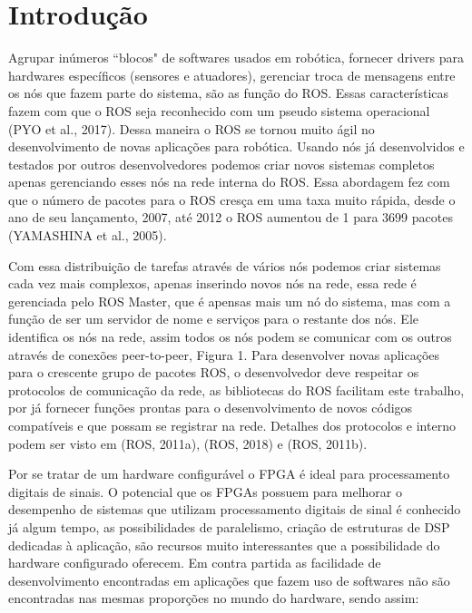 \chapter{Introdução}



Agrupar inúmeros “blocos" de softwares usados em robótica, fornecer drivers para hardwares
específicos (sensores e atuadores), gerenciar troca de mensagens entre os nós que fazem 
parte do sistema, são as função do ROS. Essas características fazem com que o ROS seja 
reconhecido com um pseudo sistema operacional (PYO et al., 2017). Dessa maneira o ROS se 
tornou muito ágil no desenvolvimento de novas aplicações para robótica. Usando nós já 
desenvolvidos e testados por outros desenvolvedores podemos criar novos sistemas 
completos apenas gerenciando esses nós na rede interna do ROS. Essa abordagem fez com 
que o número de pacotes para o ROS cresça em uma taxa muito rápida, desde o ano de seu 
lançamento, 2007, até 2012 o ROS aumentou de 1 para 3699 pacotes (YAMASHINA et al., 2005).

Com essa distribuição de tarefas através de vários nós podemos criar sistemas cada
vez mais complexos, apenas inserindo novos nós na rede, essa rede é gerenciada
pelo ROS Master, que é apensas mais um nó do sistema, mas com a função de ser um
servidor de nome e serviços para o restante dos nós. Ele identifica os nós na rede, assim
todos os nós podem se comunicar com os outros através de conexões peer-to-peer, Figura
1. Para desenvolver novas aplicações para o crescente grupo de pacotes ROS, o
desenvolvedor deve respeitar os protocolos de comunicação da rede, as bibliotecas do ROS
facilitam este trabalho, por já fornecer funções prontas para o desenvolvimento
de novos códigos compatíveis e que possam se registrar na rede. Detalhes dos protocolos e
interno podem ser visto em (ROS, 2011a), (ROS, 2018) e (ROS, 2011b).

Por se tratar de um hardware configurável o FPGA é ideal para processamento
digitais de sinais. O potencial que os FPGAs possuem para melhorar o 
desempenho de sistemas que utilizam processamento digitais de sinal é conhecido já algum
tempo, as possibilidades de paralelismo, criação de estruturas de DSP dedicadas à aplicação,
são recursos muito interessantes que a possibilidade do hardware configurado oferecem.
Em contra partida as facilidade de desenvolvimento encontradas em aplicações que
fazem uso de softwares não são encontradas nas mesmas proporções no mundo do hardware,
sendo assim:

